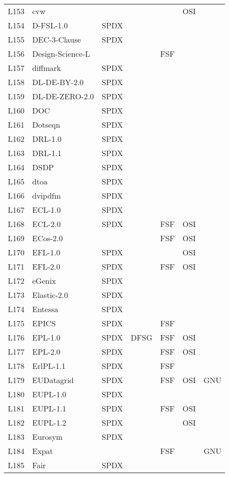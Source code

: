\begin{longtable}[h]{m{2cm} | m{7cm} | c | c | c | c | c}
L153 & cvw &  &  &  & OSI &  \\
L154 & D-FSL-1.0 & SPDX &  &  &  &  \\
L155 & DEC-3-Clause & SPDX &  &  &  &  \\
L156 & Design-Science-L &  &  & FSF &  &  \\
L157 & diffmark & SPDX &  &  &  &  \\
L158 & DL-DE-BY-2.0 & SPDX &  &  &  &  \\
L159 & DL-DE-ZERO-2.0 & SPDX &  &  &  &  \\
L160 & DOC & SPDX &  &  &  &  \\
L161 & Dotseqn & SPDX &  &  &  &  \\
L162 & DRL-1.0 & SPDX &  &  &  &  \\
L163 & DRL-1.1 & SPDX &  &  &  &  \\
L164 & DSDP & SPDX &  &  &  &  \\
L165 & dtoa & SPDX &  &  &  &  \\
L166 & dvipdfm & SPDX &  &  &  &  \\
L167 & ECL-1.0 & SPDX &  &  &  &  \\
L168 & ECL-2.0 & SPDX &  & FSF & OSI &  \\
L169 & ECos-2.0 &  &  & FSF & OSI &  \\
L170 & EFL-1.0 & SPDX &  &  & OSI &  \\
L171 & EFL-2.0 & SPDX &  & FSF & OSI &  \\
L172 & eGenix & SPDX &  &  &  &  \\
L173 & Elastic-2.0 & SPDX &  &  &  &  \\
L174 & Entessa & SPDX &  &  &  &  \\
L175 & EPICS & SPDX &  & FSF &  &  \\
L176 & EPL-1.0 & SPDX & DFSG & FSF & OSI &  \\
L177 & EPL-2.0 & SPDX &  & FSF & OSI &  \\
L178 & ErlPL-1.1 & SPDX &  & FSF &  &  \\
L179 & EUDatagrid & SPDX &  & FSF & OSI & GNU \\
L180 & EUPL-1.0 & SPDX &  &  &  &  \\
L181 & EUPL-1.1 & SPDX &  & FSF & OSI &  \\
L182 & EUPL-1.2 & SPDX &  &  & OSI &  \\
L183 & Eurosym & SPDX &  &  &  &  \\
L184 & Expat &  &  & FSF &  & GNU \\
L185 & Fair & SPDX &  &  &  &  \\

\end{longtable}

